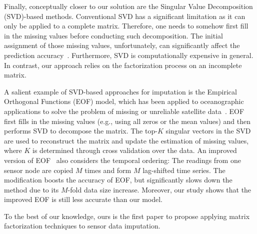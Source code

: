 Finally, conceptually closer to our solution are the Singular Value
Decomposition (SVD)-based methods.  Conventional SVD has a significant
limitation as it can only be applied to a complete matrix.  Therefore,
one needs to somehow first fill in the missing values before
conducting such decomposition.  The initial assignment of those
missing values, unfortunately, can significantly affect the prediction
accuracy~\cite{koren2009matrix}.  Furthermore, SVD is computationally
expensive in general.  In contrast, our approach relies on the
factorization process on an incomplete matrix.


A salient example of SVD-based approaches for imputation is the Empirical Orthogonal Functions
(EOF) model, which has been applied to oceanographic applications to
solve the problem of missing or unreliable satellite
data~\cite{beckers2003eof}.  EOF first fills in the missing values
(e.g., using all zeros or the mean values) and then performs SVD 
to decompose the matrix. The top-$K$ singular vectors in the SVD are used 
to reconstruct the matrix and update the estimation of missing values, 
where $K$ is determined through cross validation over the data.
An improved version of EOF~\cite{kondrashov2006spatio} also 
considers the temporal ordering:
The readings from one sensor node are copied $M$ times and form $M$ lag-shifted time series.
The modification boosts the accuracy of EOF, but significantly slows down the method
due to its $M$-fold data size increase.
Moreover, our study shows that the improved EOF is still less accurate than our model.


To the best of our knowledge, ours is the first paper to propose applying
matrix factorization techniques to sensor data imputation.


